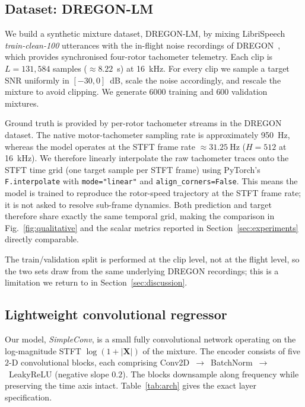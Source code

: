 \documentclass{QD_2026}
\begin{document}
\subsection{Dataset: DREGON-LM}
\label{sec:dataset}

We build a synthetic mixture dataset, DREGON-LM, by mixing
LibriSpeech~\cite{panayotov2015librispeech} \emph{train-clean-100} utterances
with the in-flight noise recordings of DREGON~\cite{strauss2018dregon}, which
provides synchronised four-rotor tachometer telemetry.
Each clip is $L = 131{,}584$ samples ($\approx 8.22$~s) at \SI{16}{\kilo\hertz}.
For every clip we sample a target SNR uniformly in $[-30, 0]$~dB, scale the
noise accordingly, and rescale the mixture to avoid clipping.
We generate $6000$ training and $600$ validation mixtures.

Ground truth is provided by per-rotor tachometer streams in the DREGON dataset.
The native motor-tachometer sampling rate is approximately \SI{950}{\hertz},
whereas the model operates at the STFT frame rate
$\approx \SI{31.25}{\hertz}$ ($H = 512$ at \SI{16}{\kilo\hertz}).
We therefore linearly interpolate the raw tachometer traces onto the STFT time
grid (one target sample per STFT frame) using PyTorch's
\texttt{F.interpolate} with \texttt{mode="linear"} and
\texttt{align\_corners=False}.
This means the model is trained to reproduce the rotor-speed trajectory at the
STFT frame rate; it is not asked to resolve sub-frame dynamics.
Both prediction and target therefore share exactly the same temporal grid,
making the comparison in Fig.~\ref{fig:qualitative} and the scalar metrics
reported in Section~\ref{sec:experiments} directly comparable.

The train/validation split is performed at the clip level, not at the flight
level, so the two sets draw from the same underlying DREGON recordings; this
is a limitation we return to in Section~\ref{sec:discussion}.

\subsection{Lightweight convolutional regressor}
\label{sec:simpleconv}

Our model, \emph{SimpleConv}, is a small fully convolutional network
operating on the log-magnitude STFT $\log(1 + |\mathbf{X}|)$ of the mixture.
The encoder consists of five $2$-D convolutional blocks, each comprising
Conv2D~$\to$~BatchNorm~$\to$~LeakyReLU (negative slope $0.2$).
The blocks downsample along frequency while preserving the time axis intact.
Table~\ref{tab:arch} gives the exact layer specification.
\end{document}
